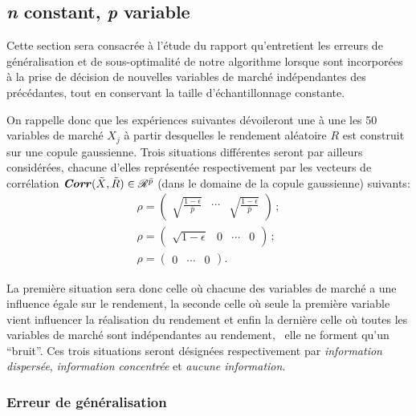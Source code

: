 \subsection{\textit{n} constant, \textit{p} variable}
\label{emp:pvar}

Cette section sera consacrée à l'étude du rapport qu'entretient les erreurs de
généralisation et de sous-optimalité de notre algorithme lorsque sont incorporées à la
prise de décision de nouvelles variables de marché indépendantes des précédantes, tout en
conservant la taille d'échantillonnage constante.

On rappelle donc que les expériences suivantes dévoileront une à une les 50 variables de
marché $X_j$ à partir desquelles le rendement aléatoire $R$ est construit sur une copule
gaussienne. Trois situations différentes seront par ailleurs considérées, chacune d'elles
représentée respectivement par les vecteurs de corrélation
$\operatorname{\mbox{\textbf{\textit{Corr}}}}(\tilde X,\tilde R) \in \mathscr{R}^{\bar p}$ (dans le domaine de la copule gaussienne)
suivants:
\begin{gather}
  \rho = \left(\begin{matrix}\sqrt{\frac{1-\epsilon}{\bar p}} & \cdots & \sqrt{\frac{1-\epsilon}{\bar
          p}}\end{matrix}\right)\,;\\
  \rho = \left(\begin{matrix}\sqrt{1-\epsilon} & 0 & \cdots & 0\end{matrix}\right)\,;\\
  \rho = \left(\begin{matrix}0 & \cdots & 0\end{matrix}\right).
\end{gather}

La première situation sera donc celle où chacune des variables de marché a une influence
égale sur le rendement, la seconde celle où seule la première variable vient influencer la
réalisation du rendement et enfin la dernière celle où toutes les variables de marché sont
indépendantes au rendement, \ie\ elle ne forment qu'un ``bruit''. Ces trois situations
seront désignées respectivement par \textit{information dispersée}, \textit{information
  concentrée} et \textit{aucune information}.


\subsubsection{Erreur de généralisation}


